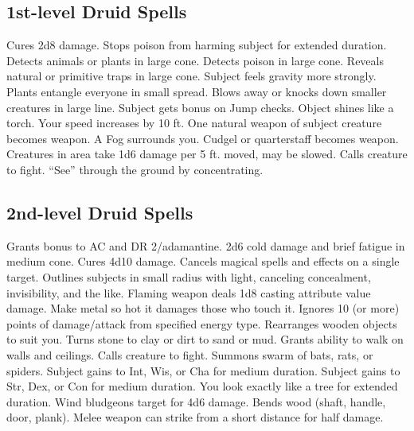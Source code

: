 \subsection{1st-level Druid Spells}
\begin{spelllist}
   Cures 2d8 damage.
   Stops poison from harming subject for extended duration.
   Detects animals or plants in large cone.
   Detects poison in large cone.
   Reveals natural or primitive traps in large cone.
   Subject feels gravity more strongly.
   Plants entangle everyone in small spread.
   Blows away or knocks down smaller creatures in large line.
   Subject gets bonus on Jump checks.
   Object shines like a torch.
   Your speed increases by 10 ft.
   One natural weapon of subject creature becomes  weapon.
   A Fog surrounds you.
   Cudgel or quarterstaff becomes  weapon.
   Creatures in area take 1d6 damage per 5 ft. moved, may be slowed.
   Calls creature to fight.
   ``See'' through the ground by concentrating.
\end{spelllist}

\subsection{2nd-level Druid Spells}
\begin{spelllist}
   Grants  bonus to AC and DR 2/adamantine.
   2d6 cold damage and brief fatigue in medium cone.
   Cures 4d10 damage.
   Cancels magical spells and effects on a single target.
   Outlines subjects in small radius with light, canceling concealment, invisibility, and the like.
   Flaming weapon deals 1d8 \add casting attribute value damage.
   Make metal so hot it damages those who touch it.
   Ignores 10 (or more) points of damage/attack from specified energy type.
   Rearranges wooden objects to suit you.
   Turns stone to clay or dirt to sand or mud.
   Grants ability to walk on walls and ceilings.
   Calls creature to fight.
   Summons swarm of bats, rats, or spiders.
   Subject gains  to Int, Wis, or Cha for medium duration.
   Subject gains  to Str, Dex, or Con for medium duration.
   You look exactly like a tree for extended duration.
   Wind bludgeons target for 4d6 damage.
   Bends wood (shaft, handle, door, plank).
   Melee weapon can strike from a short distance for half damage.
\end{spelllist}

